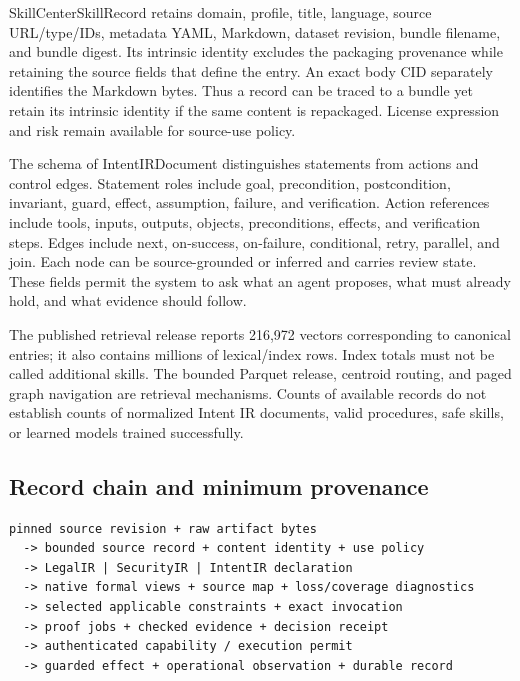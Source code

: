 \documentclass{article}
\begin{document}
SkillCenterSkillRecord retains domain, profile, title, language, source URL/type/IDs, metadata YAML, Markdown, dataset revision, bundle filename, and bundle digest. Its intrinsic identity excludes the packaging provenance while retaining the source fields that define the entry. An exact body CID separately identifies the Markdown bytes. Thus a record can be traced to a bundle yet retain its intrinsic identity if the same content is repackaged. License expression and risk remain available for source-use policy.

The schema of IntentIRDocument distinguishes statements from actions and control edges. Statement roles include goal, precondition, postcondition, invariant, guard, effect, assumption, failure, and verification. Action references include tools, inputs, outputs, objects, preconditions, effects, and verification steps. Edges include next, on-success, on-failure, conditional, retry, parallel, and join. Each node can be source-grounded or inferred and carries review state. These fields permit the system to ask what an agent proposes, what must already hold, and what evidence should follow.

The published retrieval release reports 216,972 vectors corresponding to canonical entries; it also contains millions of lexical/index rows. Index totals must not be called additional skills. The bounded Parquet release, centroid routing, and paged graph navigation are retrieval mechanisms. Counts of available records do not establish counts of normalized Intent IR documents, valid procedures, safe skills, or learned models trained successfully.

\subsection{Record chain and minimum provenance}
\begin{verbatim}
pinned source revision + raw artifact bytes
  -> bounded source record + content identity + use policy
  -> LegalIR | SecurityIR | IntentIR declaration
  -> native formal views + source map + loss/coverage diagnostics
  -> selected applicable constraints + exact invocation
  -> proof jobs + checked evidence + decision receipt
  -> authenticated capability / execution permit
  -> guarded effect + operational observation + durable record
\end{verbatim}
\end{document}
